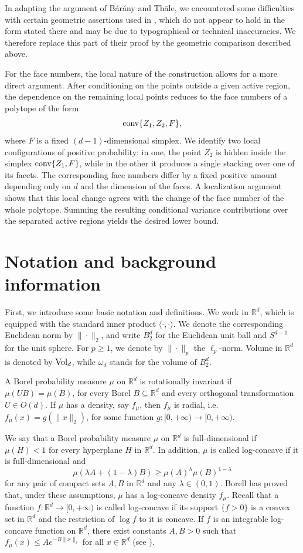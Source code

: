 \documentclass[10pt]{amsart}
\newcommand{\ls}{\leqslant}
\newcommand{\gr}{\geqslant}
\newcommand{\1}{\textbf{1}}
\newcommand{\conv}{{\rm conv}}
\newcommand{\vol}{{\rm Vol}}
\numberwithin{equation}{section} %
\theoremstyle{remark}
\theoremstyle{definition}
\begin{document}
In adapting the argument of B\'ar\'any and Th\"ale, we encountered some
difficulties with certain geometric assertions used in \cite{Bar-Th},
which do not appear to hold in the form stated there and may be due to
typographical or technical inaccuracies. We therefore replace this part of
their proof by the geometric comparison described above.

For the face numbers, the local nature of the construction allows for a more
direct argument. After conditioning on the points outside a given active
region, the dependence on the remaining local points reduces to the face
numbers of a polytope of the form \[
\conv\{Z_1,Z_2,F\},
\] where $F$ is a fixed $(d-1)$-dimensional simplex. We identify
two local configurations of positive probability: in one, the point $Z_2$ is
hidden inside the simplex $\conv\{Z_1,F\}$, while in the other it produces a single
stacking over one of its facets. The corresponding face numbers differ by a
fixed positive amount depending only on $d$ and the dimension of the faces.
A localization argument shows that this local change agrees with the change
of the face number of the whole polytope. Summing the resulting conditional
variance contributions over the separated active regions yields the desired
lower bound.

\section{Notation and background information}
First, we introduce some basic notation and definitions. We work in $\mathbb{R}^d$, which is equipped with the standard inner product $\langle \cdot, \cdot \rangle$. We denote the corresponding Euclidean norm by $\|\cdot\|_2$, and write $B_2^d$ for the Euclidean unit ball and $S^{d-1}$ for the unit sphere. For $p \geq 1$, we denote by $\|\cdot\|_p$ the $\ell_p$-norm. Volume in $\mathbb{R}^d$ is denoted by $\vol_d$, while $\omega_d$ stands for the volume of $B_2^d$.

A  Borel probability measure $\mu$ on $\mathbb{R}^d$ is rotationally invariant if $\mu(UB)=\mu(B)$, for every Borel $B \subseteq \mathbb{R}^d$ and every orthogonal transformation $U \in O(d)$. If $\mu$ has a density, say $f_\mu$, then $f_\mu$ is radial, i.e. $f_\mu(x)=g(\|x\|_2)$, for some function $g: [0,+\infty) \to [0,+\infty)$.

We say that a Borel probability measure $\mu$ on $\mathbb{R}^d$ is  full-dimensional if $\mu(H)<1$ for every hyperplane $H$ in $\mathbb{R}^d$. In addition,  $\mu$ is called log-concave if it is full-dimensional and
$$\mu(\lambda A+(1-\lambda)B) \gr \mu(A)^{\lambda}\mu(B)^{1-\lambda}$$
for any pair of compact sets $A,B$ in ${\mathbb R}^d$ and any $\lambda \in (0,1)$. Borell \cite{Borell-1974} has proved that, under these assumptions, $\mu $ has a log-concave density $f_{{\mu }}$. Recall that a function $f:\mathbb R^d \rightarrow [0,+\infty)$ is called log-concave if its support $\{f>0\}$ is a convex set in ${\mathbb R}^d$ and the restriction of $\log{f}$ to it is concave. If $f$ is an integrable log-concave function on $\mathbb{R}^d$, there exist constants $A,B>0$ such that $f_\mu(x)\ls Ae^{-B\|x\|_2}$ for all $x\in {\mathbb R}^d$ (see \cite[Lemma~2.2.1]{BGVV-book}).
\end{document}
